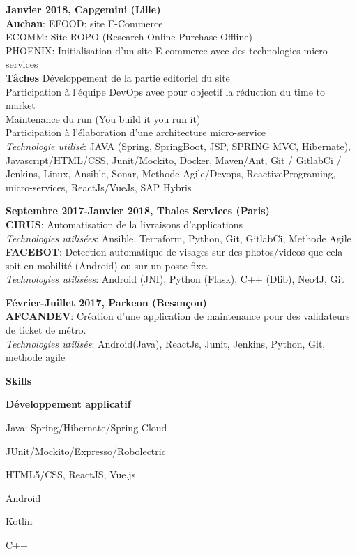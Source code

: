 \documentclass[a4paper,11pt,final]{memoir}
\newcommand\tab[1][1,8cm]{\hspace*{#1}}
\newcommand{\CVSection}[1]
	{\Large\textbf{#1}\par
	\normalsize\normalfont}
\newcommand{\CVItem}[1]
	{\textbf{\color{RoyalBlue} #1}}
\begin{document}
\CVItem{Janvier 2018, Capgemini (Lille) }\\
\textbf{Auchan}: EFOOD: site E-Commerce\\
\tab ECOMM: Site ROPO (Research Online Purchase Offline)\\
\tab PHOENIX:  Initialisation d'un site E-commerce avec des technologies micro-services\\
\textbf{Tâches  }   \textbullet  Développement de la partie editoriel du site \\
\tab \textbullet  Participation à l'équipe DevOps avec pour objectif la réduction du time to market \\
\tab \textbullet Maintenance du run (You build it you run it) \\
\tab \textbullet Participation à l'élaboration d'une architecture micro-service  \\
 \textit{Technologie utilisé}: JAVA (Spring, SpringBoot, JSP, SPRING MVC, Hibernate), Javascript/HTML/CSS, Junit/Mockito, Docker, Maven/Ant, Git / GitlabCi / Jenkins, Linux, Ansible, Sonar, Methode Agile/Devops, ReactivePrograming, micro-services, ReactJs/VueJs, SAP Hybris

\CVItem{Septembre 2017-Janvier 2018, Thales Services (Paris) }\\
\textbf{CIRUS}: Automatisation de la livraisons d'applications\\
 \textit{Technologies utilisées}: Ansible, Terraform, Python, Git, GitlabCi, Methode Agile \\
 \textbf{FACEBOT}: Detection automatique de visages sur des photos/videos que cela soit en mobilité (Android) ou sur un poste fixe.\\
 \textit{Technologies utilisées}: Android (JNI), Python (Flask), C++ (Dlib), Neo4J, Git 


\CVItem{Février-Juillet 2017, Parkeon (Besançon)}\\
\textbf{AFCANDEV}: Création d’une application de maintenance pour des validateurs de ticket de métro. \\
 \textit{Technologies utilisés}: Android(Java), ReactJs, Junit, Jenkins, Python, Git, methode agile


\CVSection{Skills}
\CVItem{Développement applicatif}
\begin{multicols}{2}
\begin{compactitem}[\color{RoyalBlue}$\circ$]
	\item Java: Spring/Hibernate/Spring Cloud
	\item  JUnit/Mockito/Expresso/Robolectric
	\item  HTML5/CSS,  ReactJS, Vue.js
	\item Android
	 \item Kotlin 
	\item C++
\end{compactitem}
\end{multicols}
\end{document}
